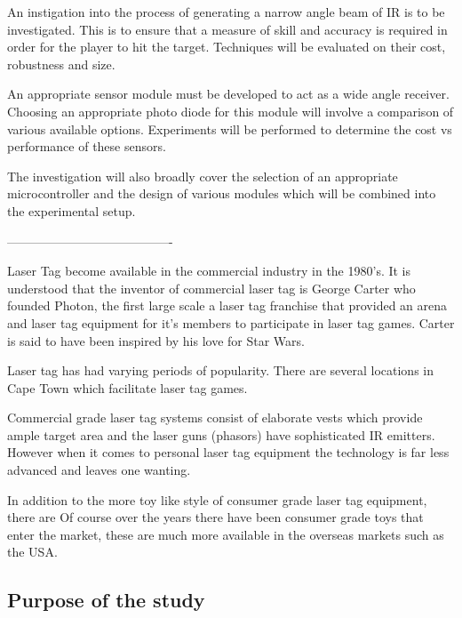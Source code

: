 An instigation into the process of generating a narrow angle beam of IR is to be investigated. This is to ensure that a measure of skill and accuracy is required in order for the player to hit the target. Techniques will be evaluated on their cost, robustness and size.

An appropriate sensor module must be developed to act as a wide angle receiver. Choosing an appropriate photo diode for this module will involve a comparison of various available options. Experiments will be performed to determine the cost vs performance of these sensors.

The investigation will also broadly cover the selection of an appropriate microcontroller and the design of various modules which will be combined into the experimental setup.

----------------------------------------

Laser Tag become available in the commercial industry in the 1980's. It is understood that the inventor of commercial laser tag is George Carter who founded Photon, the first large scale a laser tag franchise that provided an arena and laser tag equipment for it's members to participate in laser tag games. Carter is said to have been inspired by his love for Star Wars.

Laser tag has had varying periods of popularity.
There are several locations in Cape Town which facilitate laser tag games.

Commercial grade laser tag systems consist of elaborate vests which provide ample target area and the laser guns (phasors) have sophisticated IR emitters. However when it comes to personal laser tag equipment the technology is far less advanced and leaves one wanting.

In addition to the more toy like style of consumer grade laser tag equipment, there are  Of course over the years there have been consumer grade toys that enter the market, these are much more available in the overseas markets such as the USA.


\fi

\subsection{Purpose of the study}


